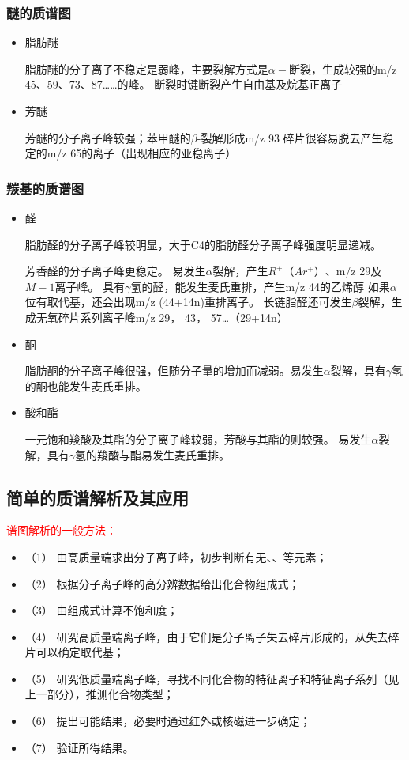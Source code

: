 \subsubsection*{醚的质谱图}
\begin{itemize}
    \item 脂肪醚
    
    脂肪醚的分子离子不稳定是弱峰，主要裂解方式是$\alpha -$断裂，生成较强的m/z 45、59、73、87……的峰。
    断裂时键断裂产生自由基及烷基正离子
    \item 芳醚
    
    芳醚的分子离子峰较强；苯甲醚的$\beta$-裂解形成m/z 93 碎片很容易脱去产生稳定的m/z 65的离子（出现相应的亚稳离子）
\end{itemize}
\subsubsection*{羰基的质谱图}
\begin{itemize}
    \item  醛
    
    脂肪醛的分子离子峰较明显，大于C4的脂肪醛分子离子峰强度明显递减。
    
    芳香醛的分子离子峰更稳定。
    易发生$\alpha$裂解，产生$R^{+}（Ar^{+}）$、m/z 29及$M-1$离子峰。
    具有$\gamma$氢的醛，能发生麦氏重排，产生m/z 44的乙烯醇
    如果$\alpha$位有取代基，还会出现m/z (44+14n)重排离子。
    长链脂醛还可发生$\beta$裂解，生成无氧碎片系列离子峰m/z 29， 43， 57…（29+14n）
    \item  酮
    
    脂肪酮的分子离子峰很强，但随分子量的增加而减弱。易发生$\alpha$裂解，具有$\gamma$氢的酮也能发生麦氏重排。
    \item 酸和酯
    
    一元饱和羧酸及其酯的分子离子峰较弱，芳酸与其酯的则较强。
    易发生$\alpha$裂解，具有$\gamma$氢的羧酸与酯易发生麦氏重排。
\end{itemize}

\subsection{简单的质谱解析及其应用}
\begin{note}
    

\textcolor{red}{谱图解析的一般方法：}
\begin{itemize}
    \item（1） 由高质量端求出分子离子峰，初步判断有无、、等元素；
    \item（2） 根据分子离子峰的高分辨数据给出化合物组成式；
    \item（3） 由组成式计算不饱和度；
    \item（4） 研究高质量端离子峰，由于它们是分子离子失去碎片形成的，从失去碎片可以确定取代基；
    \item（5） 研究低质量端离子峰，寻找不同化合物的特征离子和特征离子系列（见上一部分），推测化合物类型；
    \item（6） 提出可能结果，必要时通过红外或核磁进一步确定；
    \item（7） 验证所得结果。
\end{itemize}
\end{note}

